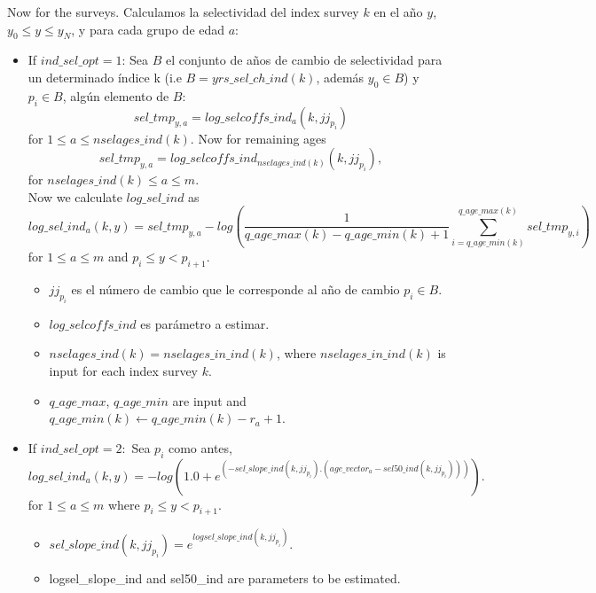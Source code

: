 \documentclass{article}
\begin{document}
Now for the surveys. Calculamos la selectividad del index survey $k$ en el año $y$, $y_0\leq y \leq y_N$, y para cada grupo de edad $a$:\\
\begin{itemize}

\item If $ind\_sel\_opt=1$:
Sea $B$ el conjunto de años de cambio de selectividad para un determinado índice k (i.e $B= yrs\_sel\_ch\_ind(k)$, además $y_0\in B$) y $p_i\in B$, algún elemento de $B$:
\begin{equation}
    sel\_tmp_{y,a} = log\_selcoffs\_ind_a(k,jj_{p_i})
\end{equation}
for $1\leq a \leq nselages\_ind(k)$.
Now for remaining ages
\begin{equation}
    sel\_tmp_{y,a}= log\_selcoffs\_ind_{nselages\_ind(k)}(k,jj_{p_i}),
\end{equation}
for $nselages\_ind(k)\leq a \leq m$. \\

Now we calculate $log\_sel\_ind$ as
     \begin{equation}
        log\_sel\_ind_a(k,y)=sel\_tmp_{y,a}-log\left(\dfrac{1}{q\_age\_max(k)-q\_age\_min(k)+1}\sum_{i=q\_age\_min(k)}^{q\_age\_max(k)}sel\_tmp_{y,i}\right)
    \end{equation}
    for $1\leq a \leq m$ and $p_i\leq y < p_{i+1}$.\\ 
\begin{itemize}    
    \item $jj_{p_i}$ es el número de cambio que le corresponde al año de cambio $p_i\in B$.
    \item $log\_selcoffs\_ind$ es parámetro a estimar.
     \item $nselages\_ind(k)=nselages\_in\_ind(k)$, where $nselages\_in\_ind(k)$ is input for each index survey $k$.
     \item $q\_age\_max$, $q\_age\_min$ are input and $q\_age\_min(k) \leftarrow  q\_age\_min(k) - r_a + 1$.
\end{itemize}

    
    \item If $ind\_sel\_opt=2:$
    Sea $p_i$ como antes, 
\begin{equation}
            log\_sel\_ind_a(k,y) = - log( 1.0 + e^{(-sel\_slope\_ind(k,jj_{p_i}) . ( age\_vector_a - sel50\_ind(k,jj_{p_i})) )}).
        \end{equation}
        for $1\leq a \leq m
$ where $p_i\leq y < p_{i+1}$.
        \begin{itemize}
            \item $sel\_slope\_ind(k,jj_{p_i}) = e^{logsel\_slope\_ind(k,jj_{p_i})}$.
            \item logsel\_slope\_ind and sel50\_ind are parameters to be estimated.
        \end{itemize}


\end{itemize}
\end{document}
